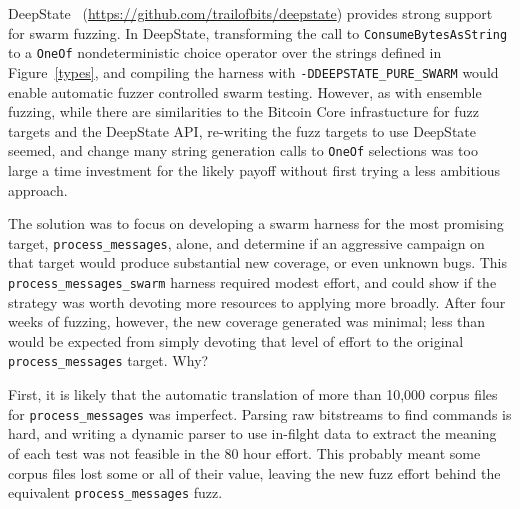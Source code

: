 \begin{sloppypar}
DeepState~\cite{goodman2018deepstate} (\url{https://github.com/trailofbits/deepstate}) provides strong support for swarm fuzzing.  In DeepState, transforming the call to {\tt ConsumeBytesAsString} to a {\tt OneOf} nondeterministic choice operator over the strings defined in Figure~\ref{types}, and compiling the harness with {\tt -DDEEPSTATE\_PURE\_SWARM} would enable automatic fuzzer controlled swarm testing. However, as with ensemble fuzzing, while there are similarities to the Bitcoin Core infrastucture for fuzz targets and the DeepState API, re-writing the fuzz targets to use DeepState seemed, and change many string generation calls to {\tt OneOf} selections was too large a time investment for the likely payoff without first trying a less ambitious approach.

The solution was to focus on developing a swarm harness for the most promising target, {\tt process\_messages}, alone, and determine if an aggressive campaign on that target would produce substantial new coverage, or even unknown bugs. This {\tt process\_messages\_swarm} harness required modest effort, and could show if the strategy was worth devoting more resources to applying more broadly.  After four weeks of fuzzing, however, the new coverage generated was minimal; less than would be expected from simply devoting that level of effort to the original {\tt process\_messages} target.  Why?

First, it is likely that the automatic translation of more than 10,000 corpus files for {\tt process\_messages} was imperfect.  Parsing raw bitstreams to find commands is hard, and writing a dynamic parser to use in-filght data to extract the meaning of each test was not feasible in the 80 hour effort.  This probably meant some corpus files lost some or all of their value, leaving the new fuzz effort behind the equivalent {\tt process\_messages} fuzz.


\end{sloppypar}
